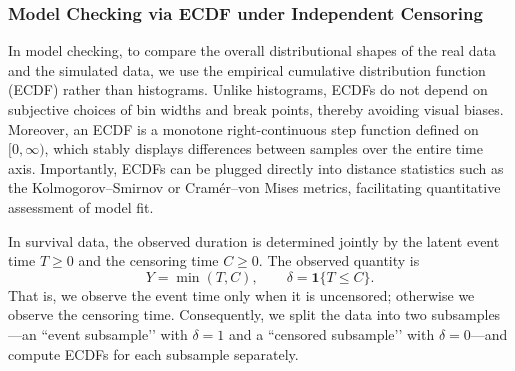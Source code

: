 \subsubsection{Model Checking via ECDF under Independent Censoring}
In model checking, to compare the overall distributional shapes of the real data and the simulated data, we use the empirical cumulative distribution function (ECDF) rather than histograms. Unlike histograms, ECDFs do not depend on subjective choices of bin widths and break points, thereby avoiding visual biases. Moreover, an ECDF is a monotone right-continuous step function defined on $[0,\infty)$, which stably displays differences between samples over the entire time axis. Importantly, ECDFs can be plugged directly into distance statistics such as the Kolmogorov–Smirnov or Cramér–von Mises metrics, facilitating quantitative assessment of model fit.

In survival data, the observed duration is determined jointly by the latent event time $T\ge 0$ and the censoring time $C\ge 0$. The observed quantity is
$$
Y=\min(T,C),\qquad \delta=\mathbf 1\{T\le C\}.
$$
That is, we observe the event time only when it is uncensored; otherwise we observe the censoring time. Consequently, we split the data into two subsamples—an “event subsample’’ with $\delta=1$ and a “censored subsample’’ with $\delta=0$—and compute ECDFs for each subsample separately.

